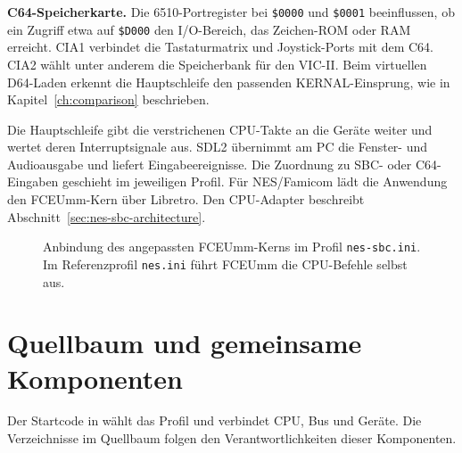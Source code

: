 \documentclass[fontsize=10.2bp,DIV=calc,oneside,open=any,headings=normal,numbers=noenddot]{scrbook}
\newcommand{\tableSize}{\fontsize{9bp}{11bp}\selectfont}
\newcommand{\captionSize}{\fontsize{8.6bp}{11bp}\selectfont}
\begin{document}
\textbf{C64-Speicherkarte.} Die 6510-Portregister bei
\texttt{\$0000} und \texttt{\$0001} beeinflussen, ob ein Zugriff etwa auf
\texttt{\$D000} den I/O-Bereich, das Zeichen-ROM oder RAM erreicht.
CIA1 verbindet die Tastaturmatrix und Joystick-Ports mit dem C64.
CIA2 wählt unter anderem die Speicherbank für den VIC-II. Beim
virtuellen D64-Laden erkennt die Hauptschleife den passenden
KERNAL-Einsprung, wie in Kapitel~\ref{ch:comparison} beschrieben.

Die Hauptschleife gibt die verstrichenen CPU-Takte an die Geräte weiter
und wertet deren Interruptsignale aus. SDL2 übernimmt am PC die
Fenster- und Audioausgabe und liefert Eingabeereignisse. Die Zuordnung
zu SBC- oder C64-Eingaben geschieht im jeweiligen Profil. Für NES/Famicom
lädt die Anwendung den FCEUmm-Kern über Libretro. Den CPU-Adapter
beschreibt Abschnitt~\ref{sec:nes-sbc-architecture}.

\begin{figure}[H]
  \centering
  \caption{Anbindung des angepassten FCEUmm-Kerns im Profil \texttt{nes-sbc.ini}.
    Im Referenzprofil \texttt{nes.ini} führt FCEUmm die CPU-Befehle selbst aus.}
\end{figure}

\clearpage
\section{Quellbaum und gemeinsame Komponenten}\label{sec:source-tree}
Der Startcode in  wählt das Profil und verbindet CPU, Bus
und Geräte. Die Verzeichnisse im Quellbaum folgen den Verantwortlichkeiten
dieser Komponenten.
\end{document}
